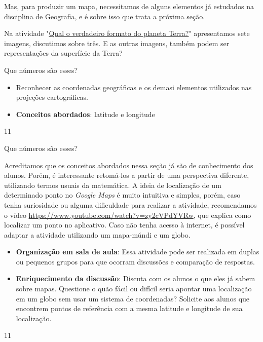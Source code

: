Mas, para produzir um mapa, necessitamos de alguns elementos já estudados na disciplina de Geografia, e é sobre isso que trata a próxima seção.



\begin{reflection}
Na atividade "\hyperref[forma_terra]{Qual o verdadeiro formato do planeta Terra?}" apresentamos sete imagens, discutimos sobre três. E as outras imagens, também podem ser representações da superfície da Terra?
\end{reflection}

\cleardoublepage
\def\currentcolor{session1}
\begin{ObjetivoEsp}{Que números são esses?}
{
  \begin{itemize}
  \item Reconhecer as coordenadas geográficas e os demasi elementos utilizados nas projeções cartográficas.
  \item \textbf{Conceitos abordados}: latitude e longitude
  \end{itemize}
}{1}{1}
\end{ObjetivoEsp}
\begin{Recomenda}{Que números são esses?}
{
Acreditamos que os conceitos abordados nessa seção já são de conhecimento dos alunos. Porém, é interessante retomá-los a partir de uma perspectiva diferente, utilizando termos usuais da matemática. A ideia de localização de um determinado ponto no \textit{Google Maps} é muito intuitiva e simples, porém, caso tenha suriosidade ou alguma dificuldade para realizar a atividade, recomendamos o vídeo \url{https://www.youtube.com/watch?v=zy2cVPdYVRw}, que explica como localizar um ponto no aplicativo. Caso não tenha acesso à internet, é possível adaptar a atividade utilizando um mapa-múndi e um globo.

\begin{itemize}
\item \textbf{Organização em sala de aula}: Essa atividade pode ser realizada em duplas ou pequenos grupos para que ocorram discussões e comparação de respostas.
\item \textbf{Enriquecimento da discussão}: Discuta com os alunos o que eles já sabem sobre mapas. Questione o quão fácil ou difícil seria apontar uma localização em um globo sem usar um sistema de coordenadas? Solicite aos alunos que encontrem pontos de referência com a mesma latitude e longitude de sua localização.
\end{itemize}
}{1}{1}
\end{Recomenda}
